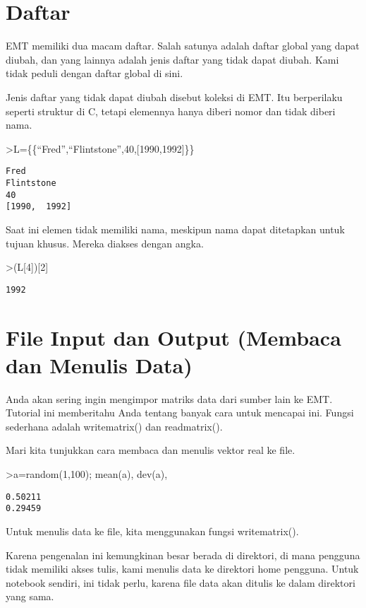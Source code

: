 \documentclass[
]{book}
\begin{document}
\chapter{Daftar}\label{daftar}

EMT memiliki dua macam daftar. Salah satunya adalah daftar global yang dapat diubah, dan yang lainnya adalah jenis daftar yang tidak dapat diubah. Kami tidak peduli dengan daftar global di sini.

Jenis daftar yang tidak dapat diubah disebut koleksi di EMT. Itu berperilaku seperti struktur di C, tetapi elemennya hanya diberi nomor dan tidak diberi nama.

\textgreater L=\{\{``Fred'',``Flintstone'',40,{[}1990,1992{]}\}\}

\begin{verbatim}
Fred
Flintstone
40
[1990,  1992]
\end{verbatim}

Saat ini elemen tidak memiliki nama, meskipun nama dapat ditetapkan untuk tujuan khusus. Mereka diakses dengan angka.

\textgreater(L{[}4{]}){[}2{]}

\begin{verbatim}
1992
\end{verbatim}

\chapter{File Input dan Output (Membaca dan Menulis Data)}\label{file-input-dan-output-membaca-dan-menulis-data}

Anda akan sering ingin mengimpor matriks data dari sumber lain ke EMT. Tutorial ini memberitahu Anda tentang banyak cara untuk mencapai ini. Fungsi sederhana adalah writematrix() dan readmatrix().

Mari kita tunjukkan cara membaca dan menulis vektor real ke file.

\textgreater a=random(1,100); mean(a), dev(a),

\begin{verbatim}
0.50211
0.29459
\end{verbatim}

Untuk menulis data ke file, kita menggunakan fungsi writematrix().

Karena pengenalan ini kemungkinan besar berada di direktori, di mana pengguna tidak memiliki akses tulis, kami menulis data ke direktori home pengguna. Untuk notebook sendiri, ini tidak perlu, karena file data akan ditulis ke dalam direktori yang sama.
\end{document}
